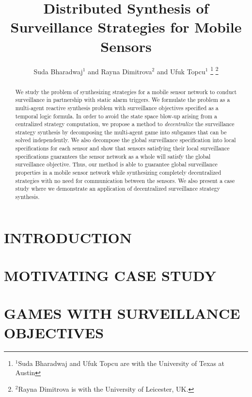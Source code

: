 \documentclass[letterpaper, 10 pt, conference]{ieeeconf}  %
\title{\LARGE \bf Distributed Synthesis of Surveillance Strategies for Mobile Sensors}
\author{Suda Bharadwaj$^{1}$ and Rayna Dimitrova$^{2}$ and Ufuk Topcu$^{1}$%
\thanks{$^{1}$Suda Bharadwaj and Ufuk Topcu are with the University of Texas at Austin}%
\thanks{$^{2}$Rayna Dimitrova is with the University of Leicester, UK.}%
}
\begin{document}
\maketitle
\thispagestyle{empty}
\pagestyle{empty}

\begin{abstract}
We study the problem of synthesizing strategies for a mobile sensor network to conduct surveillance in partnership with static alarm triggers. We formulate the problem as a multi-agent reactive synthesis problem with surveillance objectives specified as a temporal logic formula. In order to avoid the state space blow-up arising from a centralized strategy computation, we propose a method to \emph{decentralize} the surveillance strategy synthesis by decomposing the multi-agent game into subgames that can be solved independently. We also decompose the global surveillance specification into local specifications for each sensor and show that sensors satisfying their local surveillance specifications guarantees the sensor network as a whole will satisfy the global surveillance objective. Thus, our method is able to guarantee global surveillance properties in a mobile sensor network while synthesizing completely decentralized strategies with no need for communication between the sensors. We also present a case study where we demonstrate an application of decentralized surveillance strategy synthesis.
\end{abstract}


\section{INTRODUCTION}


\section{MOTIVATING CASE STUDY}\label{sec:casestudy}


\section{GAMES WITH SURVEILLANCE OBJECTIVES}

\end{document}

